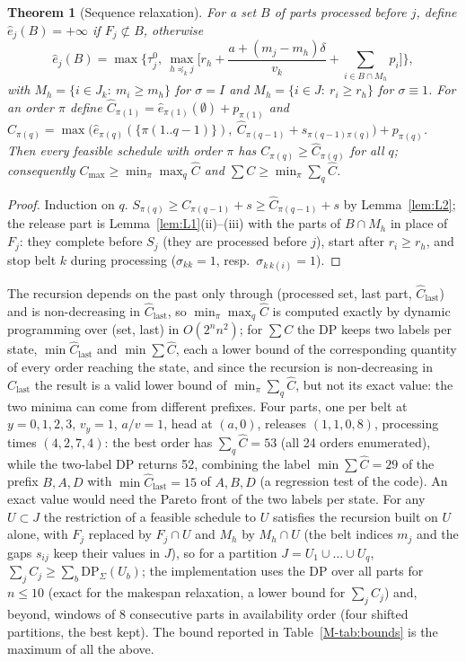 \documentclass[11pt,a4paper]{article}
\theoremstyle{plain}
\newtheorem{theorem}{Theorem}
\theoremstyle{definition}
\theoremstyle{remark}
\begin{document}
\begin{theorem}[Sequence relaxation]\label{thm:L6}
For a set $B$ of parts processed before $j$, define $\hat e_j(B)=+\infty$ if
$F_j\not\subset B$, otherwise
\[
\hat e_j(B)=\max\Big\{\tau^0_j,\ \max_{h\preceq_kj}\Big[r_h+\frac{a+(m_j-m_h)\delta}{v_k}+\sum_{i\in B\cap M_h}p_i\Big]\Big\},
\]
with $M_h=\{i\in J_k:\ m_i\ge m_h\}$ for $\sigma=I$ and $M_h=\{i\in J:\ r_i\ge r_h\}$ for
$\sigma\equiv1$. For an order $\pi$ define $\hat C_{\pi(1)}=\hat e_{\pi(1)}(\emptyset)+p_{\pi(1)}$
and $\hat C_{\pi(q)}=\max\bigl(\hat e_{\pi(q)}(\{\pi(1..q{-}1)\}),\ \hat C_{\pi(q-1)}+s_{\pi(q-1)\pi(q)}\bigr)+p_{\pi(q)}$.
Then every feasible schedule with order $\pi$ has $C_{\pi(q)}\ge\hat C_{\pi(q)}$ for all
$q$; consequently $C_{\max}\ge\min_\pi\max_q\hat C$ and $\sum C\ge\min_\pi\sum_q\hat C$.
\end{theorem}
\begin{proof}
Induction on $q$. $S_{\pi(q)}\ge C_{\pi(q-1)}+s\ge\hat C_{\pi(q-1)}+s$ by Lemma~\ref{lem:L2};
the release part is Lemma~\ref{lem:L1}(ii)--(iii) with the parts of $B\cap M_h$ in place of
$F_j$: they complete before $S_j$ (they are processed before $j$), start after
$r_i\ge r_h$, and stop belt $k$ during processing ($\sigma_{kk}=1$, resp.\
$\sigma_{k\,k(i)}=1$).
\end{proof}
The recursion depends on the past only through (processed set, last part,
$\hat C_{\text{last}}$) and is non-decreasing in $\hat C_{\text{last}}$, so
$\min_\pi\max_q\hat C$ is computed exactly by dynamic programming over (set, last) in
$O(2^nn^2)$; for $\sum C$ the DP keeps two labels per state, $\min\hat C_{\text{last}}$ and
$\min\sum\hat C$, each a lower bound of the corresponding quantity of every order reaching
the state, and since the recursion is non-decreasing in $\hat C_{\text{last}}$ the result
is a valid lower bound of $\min_\pi\sum_q\hat C$, but not its exact value: the two minima can
come from different prefixes. Four parts, one per belt at $y=0,1,2,3$, $v_y=1$, $a/v=1$,
head at $(a,0)$, releases $(1,1,0,8)$, processing times $(4,2,7,4)$: the best order has
$\sum_q\hat C=53$ (all 24 orders enumerated), while the two-label DP returns 52, combining
the label $\min\sum\hat C=29$ of the prefix $B,A,D$ with $\min\hat C_{\text{last}}=15$ of
$A,B,D$ (a regression test of the code). An exact value would need the Pareto front of the
two labels per state. For any $U\subset J$ the restriction of a feasible schedule to $U$
satisfies the recursion built on $U$ alone, with $F_j$ replaced by $F_j\cap U$ and $M_h$ by
$M_h\cap U$ (the belt indices $m_j$ and the gaps $s_{ij}$ keep their values in $J$), so
for a partition $J=U_1\cup\dots\cup U_q$, $\sum_jC_j\ge\sum_b\mathrm{DP}_\Sigma(U_b)$; the
implementation uses the DP over all parts for $n\le10$ (exact for the makespan relaxation,
a lower bound for $\sum_jC_j$) and, beyond, windows of 8 consecutive parts
in availability order (four shifted partitions, the best kept). The bound reported in
Table~\ref{M-tab:bounds} is the maximum of all the above.
\end{document}
